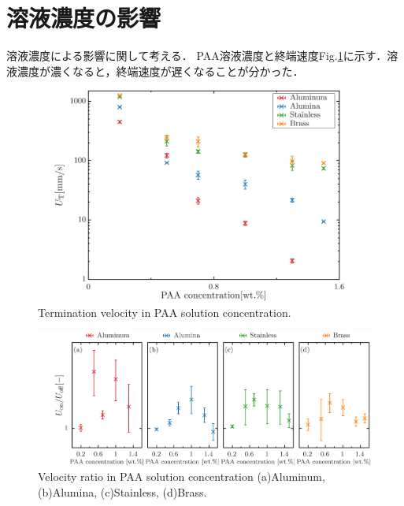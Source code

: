 \section{溶液濃度の影響}

溶液濃度による影響に関して考える．
PAA溶液濃度と終端速度Fig.\ref{fig:concentrationUT}に示す．溶液濃度が濃くなると，終端速度が遅くなることが分かった．

\begin{figure}[ht]
    \centering
    \includegraphics[width=1.0\textwidth]{./5-Results/concentration/concentrationUT.png}
    \caption{Termination velocity in PAA solution concentration.}
    \label{fig:concentrationUT}
\end{figure}

\begin{figure}[ht]
    \centering
    \includegraphics[width=1.0\textwidth]{./5-Results/concentration/concentrationUdiff.png}
    \caption{Velocity ratio in PAA solution concentration (a)Aluminum, (b)Alumina, (c)Stainless, (d)Brass.}
    \label{fig:concentrationUdiff}
\end{figure}